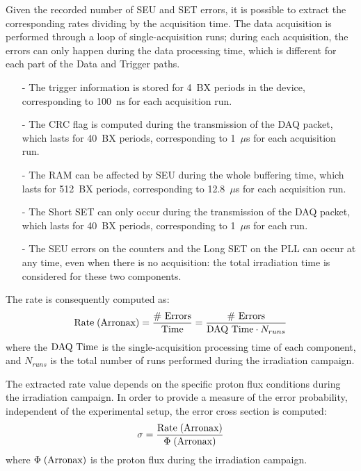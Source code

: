 \bigbreak

Given the recorded number of SEU and SET errors, it is possible to extract the corresponding rates dividing by the acquisition time. 
The data acquisition is performed through a loop of single-acquisition runs; during each acquisition, the errors can only happen during the data processing time, which is different for each part of the Data and Trigger paths.
\begin{itemize}
    \item [-] The trigger information is stored for 4~BX periods in the device, corresponding to 100~ns for each acquisition run.
    \item [-] The CRC flag is computed during the transmission of the DAQ packet, which lasts for 40~BX periods, corresponding to 1~$\mu$s for each acquisition run.
    \item [-] The RAM can be affected by SEU during the whole buffering time, which lasts for 512~BX periods, corresponding to 12.8~$\mu$s for each acquisition run.
    \item [-] The Short SET can only occur during the transmission of the DAQ packet, which lasts for 40~BX periods, corresponding to 1~$\mu$s for each run.
    \item [-] The SEU errors on the counters and the Long SET on the PLL can occur at any time, even when there is no acquisition: the total irradiation time is considered for these two components.
\end{itemize}

The rate is consequently computed as:
\begin{equation}
    \textnormal{Rate}\;(\textnormal{Arronax}) = \frac{\textnormal{\# Errors}}{\textnormal{Time}} = \frac{\textnormal{\# Errors}}{\textnormal{DAQ Time}\cdot N_{runs}}
\end{equation}
where the $\textnormal{DAQ Time}$ is the single-acquisition processing time of each component, and $N_{runs}$ is the total number of runs performed during the irradiation campaign.

The extracted rate value depends on the specific proton flux conditions during the irradiation campaign. In order to provide a measure of the error probability, independent of the experimental setup, the error cross section is computed:
\begin{equation}
    \sigma = \frac{\textnormal{Rate}\;(\textnormal{Arronax})}{\Phi\;(\textnormal{Arronax})}
\end{equation}
where $\Phi\;(\textnormal{Arronax})$ is the proton flux during the irradiation campaign.

